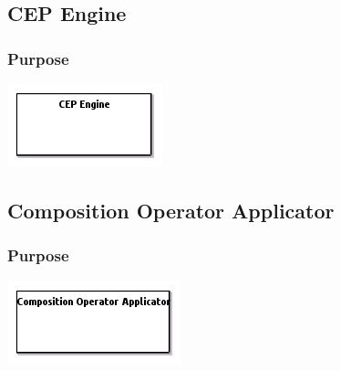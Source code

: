 \documentclass{gemoc} %
\begin{document}
\subsection{CEP Engine}


\subsubsection{Purpose}


\begin{center}
\includegraphics*[trim=0.0cm 0.0cm 0cm 0.0cm, clip=true]{../images/generated/Generated_CEP_Engine.png}
\end{center}




\subsection{Composition Operator Applicator}


\subsubsection{Purpose}


\begin{center}
\includegraphics*[trim=0.0cm 0.0cm 0cm 0.0cm, clip=true]{../images/generated/Generated_Composition_Operator_Applicator.png}
\end{center}
\end{document}
